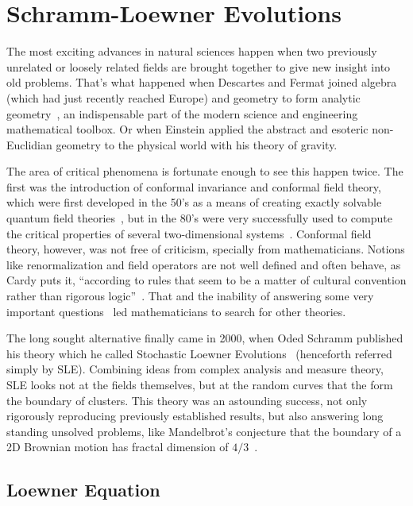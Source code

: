 \chapter{Schramm-Loewner Evolutions}
\label{ch:sle}

The most exciting advances in natural sciences happen when two previously
unrelated or loosely related fields are brought together to give new insight
into old problems. That's what happened when Descartes and Fermat joined
algebra (which had just recently reached Europe) and geometry to form analytic
geometry~\cite{Stillwell2010}, an indispensable part of the modern science and
engineering mathematical toolbox. Or when Einstein applied the abstract and
esoteric non-Euclidian geometry to the physical world with his theory of
gravity.

The area of critical phenomena is fortunate enough to see this happen twice.
The first was the introduction of conformal invariance and conformal field
theory, which were first developed in the 50's as a means of creating exactly
solvable quantum field theories~\cite{Thirring1958}, but in the 80's were very
successfully used to compute the critical properties of several two-dimensional
systems~\cite{Nahm2000}. Conformal field theory, however, was not free of
criticism, specially from mathematicians. Notions like renormalization and
field operators are not well defined and often behave, as Cardy puts it,
``according to rules that seem to be a matter of cultural convention rather
than rigorous logic''~\cite{Cardy2005}. That and the inability of answering
some very important questions~\cite{Langlands1994} led mathematicians to search
for other theories.

The long sought alternative finally came in 2000, when Oded Schramm published
his theory which he called Stochastic Loewner Evolutions~\cite{Schramm2000}
(henceforth referred simply by SLE). Combining ideas from complex analysis and
measure theory, SLE looks not at the fields themselves, but at the random
curves that the form the boundary of clusters. This theory was an astounding
success, not only rigorously reproducing previously established results, but
also answering long standing unsolved problems, like Mandelbrot's conjecture
that the boundary of a 2D Brownian motion has fractal dimension of
$4/3$~\cite{Lawler2001}.


\section{Loewner Equation}
\label{sec:le}

